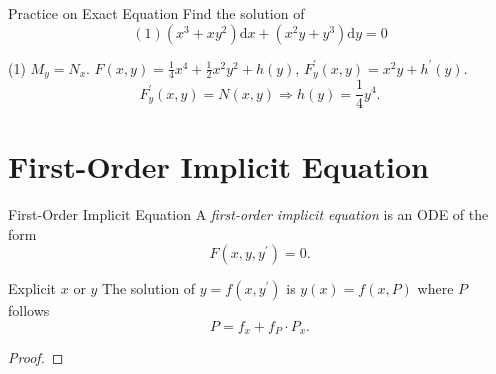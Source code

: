 \begin{example}{Practice on Exact Equation}{}
  Find the solution of
  \begin{equation}
    (1) (x^3 + xy^2)\mathrm{d} x + (x^2y + y^3)\mathrm{d} y = 0
  \end{equation}
\end{example}

\begin{solution}
  (1) $M_y = N_x$. $F(x,y) = \frac{1}{4}x^4 + \frac{1}{2} x^2 y^2 + h(y)$,
  $F^{\prime}_y(x,y) = x^2y + h^{\prime}(y)$.
  \begin{equation}
    F^{\prime}_y(x,y) = N(x,y) \Rightarrow h(y) = \frac{1}{4}y^4.
  \end{equation}
\end{solution}

\section{First-Order Implicit Equation}

\begin{definition}{First-Order Implicit Equation}{}
  A \emph{first-order implicit equation} is an ODE of the form
  \begin{equation}
    F(x, y, y^{\prime}) = 0.
  \end{equation}
\end{definition}

\begin{proposition}{Explicit $x$ or $y$}{}
  The solution of $y = f(x,y^{\prime})$ is $y(x) = f(x, P)$ where
  $P$ follows
  \begin{equation}
    P = f_x + f_P \cdot P_x.
  \end{equation}
\end{proposition}

\begin{proof}
  
\end{proof}





